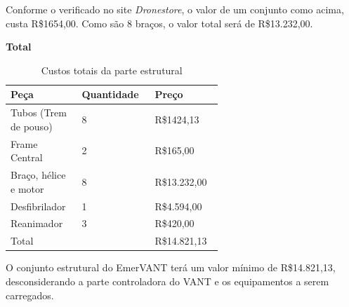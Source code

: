 Conforme o verificado no site \textit{Dronestore}, o valor de um conjunto como acima, custa
R\$1654,00. Como são 8 braços, o valor total será de R\$13.232,00.

\indent \textbf{Total}

\begin{table}[!h]
\centering
    \caption{Custos totais da parte estrutural}
\begin{tabular}{|p{0.20\linewidth}|p{0.20\linewidth}|p{0.20\linewidth}|}
\hline

Peça &Quantidade& Preço\\ \hline
Tubos (Trem de pouso)&8 &R\$1424,13\\ \hline
Frame Central &2 &R\$165,00\\ \hline
Braço, hélice e motor &8 &R\$13.232,00\\ \hline
Desfibrilador &1 &R\$4.594,00\\ \hline
Reanimador &3 &R\$420,00\\ \hline
Total& &R\$14.821,13\\ \hline
\end{tabular}
\end{table}

O conjunto estrutural do EmerVANT terá um valor mínimo de R\$14.821,13, desconsiderando a
parte controladora do VANT e os equipamentos a serem carregados.
